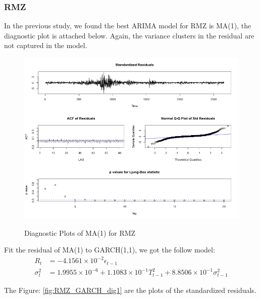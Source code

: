 \documentclass[12pt]{article}
\begin{document}
\subsubsection{RMZ}
In the previous study, we found the best ARIMA model for RMZ is MA(1), the diagnostic plot is attached below. Again, the variance clusters in the residual are not captured in the model.

\begin{figure}
  \caption{Diagnostic Plots of MA(1) for RMZ}
  \includegraphics[width = \textwidth]{../results/DiagnosticRMZ}
  \label{fig:DiagnosticRMZ}
\end{figure}

Fit the residual of MA(1) to GARCH(1,1), we got the follow model:
\begin{align*}
R_t &= -4.1561\times 10^{-2}\epsilon_{t-1} \\
\sigma_t^2 & = 1.9955 \times 10^{-6} +1.1083\times 10^{-1} T_{t-1}^2 +8.8506\times 10^{-1}  \sigma_{t-1}^2
\end{align*}

The Figure: \ref{fig:RMZ_GARCH_dig1} are the plots of the standardized residuals. 
\end{document}
